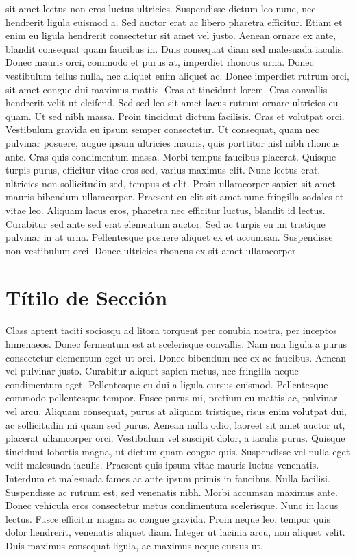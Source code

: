 sit amet lectus non eros luctus ultricies. Suspendisse dictum leo nunc, nec
hendrerit ligula euismod a. Sed auctor erat ac libero pharetra efficitur. Etiam
et enim eu ligula hendrerit consectetur sit amet vel justo. Aenean ornare ex
ante, blandit consequat quam faucibus in. Duis consequat diam sed malesuada
iaculis. Donec mauris orci, commodo et purus at, imperdiet rhoncus urna. Donec
vestibulum tellus nulla, nec aliquet enim aliquet ac. Donec imperdiet rutrum
orci, sit amet congue dui maximus mattis. Cras at tincidunt lorem. Cras
convallis hendrerit velit ut eleifend. Sed sed leo sit amet lacus rutrum ornare
ultricies eu quam. Ut sed nibh massa. Proin tincidunt dictum facilisis. Cras et
volutpat orci. Vestibulum gravida eu ipsum semper consectetur. Ut consequat,
quam nec pulvinar posuere, augue ipsum ultricies mauris, quis porttitor nisl
nibh rhoncus ante. Cras quis condimentum massa. Morbi tempus faucibus placerat.
Quisque turpis purus, efficitur vitae eros sed, varius maximus elit. Nunc lectus
erat, ultricies non sollicitudin sed, tempus et elit. Proin ullamcorper sapien
sit amet mauris bibendum ullamcorper. Praesent eu elit sit amet nunc fringilla
sodales et vitae leo. Aliquam lacus eros, pharetra nec efficitur luctus, blandit
id lectus. Curabitur sed ante sed erat elementum auctor. Sed ac turpis eu mi
tristique pulvinar in at urna. Pellentesque posuere aliquet ex et accumsan.
Suspendisse non vestibulum orci. Donec ultricies rhoncus ex sit amet ullamcorper.
\section{Títilo de Sección} Class aptent taciti sociosqu ad litora torquent per
conubia nostra, per inceptos himenaeos. Donec fermentum est at scelerisque
convallis. Nam non ligula a purus consectetur elementum eget ut orci. Donec
bibendum nec ex ac faucibus. Aenean vel pulvinar justo. Curabitur aliquet sapien
metus, nec fringilla neque condimentum eget. Pellentesque eu dui a ligula cursus
euismod. Pellentesque commodo pellentesque tempor. Fusce purus mi, pretium eu
mattis ac, pulvinar vel arcu. Aliquam consequat, purus at aliquam tristique,
risus enim volutpat dui, ac sollicitudin mi quam sed purus. Aenean nulla odio,
laoreet sit amet auctor ut, placerat ullamcorper orci. Vestibulum vel suscipit
dolor, a iaculis purus. Quisque tincidunt lobortis magna, ut dictum quam congue
quis. Suspendisse vel nulla eget velit malesuada iaculis. Praesent quis ipsum
vitae mauris luctus venenatis. Interdum et malesuada fames ac ante ipsum primis
in faucibus. Nulla facilisi. Suspendisse ac rutrum est, sed venenatis nibh.
Morbi accumsan maximus ante. Donec vehicula eros consectetur metus condimentum
scelerisque. Nunc in lacus lectus. Fusce efficitur magna ac congue gravida.
Proin neque leo, tempor quis dolor hendrerit, venenatis aliquet diam. Integer ut
lacinia arcu, non aliquet velit. Duis maximus consequat ligula, ac maximus neque
cursus ut.
